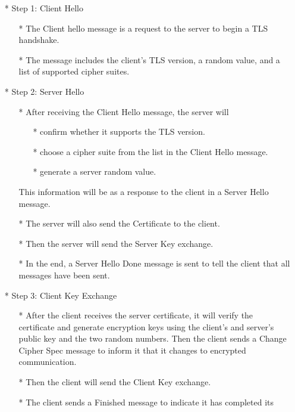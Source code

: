 \begin{enumerate}[]
    \item[*] Step 1: Client Hello
        \begin{enumerate}[]
            \item[*]  The Client hello message is a request to the server to begin a TLS handshake.
            \item[*] The message includes the client's TLS version, a random value, and a list of supported cipher suites.
        \end{enumerate}
    \item[*] Step 2: Server Hello
        \begin{enumerate}[]
            \item[*] After receiving the Client Hello message, the server will
                \begin{enumerate}[]
                    \item[*] confirm whether it supports the TLS version.
                    \item[*] choose a cipher suite from the list in the Client Hello message.
                    \item[*] generate a server random value.
                \end{enumerate}
                This information will be as a response to the client in a Server Hello message.
            \item[*] The server will also send the Certificate to the client.
            \item[*] Then the server will send the Server Key exchange.
            \item[*] In the end, a Server Hello Done message is sent to tell the client that all messages have been sent.
        \end{enumerate}
    \item[*] Step 3: Client Key Exchange
        \begin{enumerate}[]
            \item[*] After the client receives the server certificate, it will verify the 
            certificate and generate encryption keys using the client's and server's public key 
            and the two random numbers. Then the client sends a Change Cipher Spec message to 
            inform it that it changes to encrypted communication.
            \item[*] Then the client will send the Client Key exchange.
            \item[*] The client sends a Finished message to indicate it has completed its 

\end{enumerate}
\end{enumerate}
